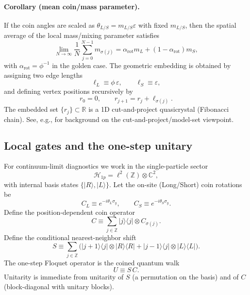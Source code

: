 \paragraph{Corollary (mean coin/mass parameter).}
If the coin angles are scaled as $\theta_{L/S}=m_{L/S}\varepsilon$ with fixed $m_{L/S}$, then the spatial average of the local mass/mixing parameter satisfies
\begin{equation}
    \lim_{N\to\infty}\frac{1}{N}\sum_{j=0}^{N-1} m_{\sigma(j)} = \alpha_{\mathrm{rot}}m_L+(1-\alpha_{\mathrm{rot}})m_S,
\end{equation}
with $\alpha_{\mathrm{rot}}=\phi^{-1}$ in the golden case.
The geometric embedding is obtained by assigning two edge lengths
\begin{equation}
    \ell_L\equiv \phi\,\varepsilon,\qquad \ell_S\equiv \varepsilon,
\end{equation}
and defining vertex positions recursively by
\begin{equation}
    r_0=0,\qquad r_{j+1}=r_j+\ell_{\sigma(j)}.
\end{equation}
The embedded set $\{r_j\}\subset\mathbb{R}$ is a 1D cut-and-project quasicrystal (Fibonacci chain).
See, e.g., \cite{Senechal1995,BaakeGrimm2013AperiodicOrder} for background on the cut-and-project/model-set viewpoint.

\subsection{Local gates and the one-step unitary}
For continuum-limit diagnostics we work in the single-particle sector
\begin{equation}
    \mathcal{H}_{1p}=\ell^2(\mathbb{Z})\otimes\mathbb{C}^2,
\end{equation}
with internal basis states $\{|R\rangle,|L\rangle\}$.
Let the on-site (Long/Short) coin rotations be
\begin{equation}
    C_L\equiv e^{-i\theta_L\sigma_y},\qquad C_S\equiv e^{-i\theta_S\sigma_y}.
\end{equation}
Define the position-dependent coin operator
\begin{equation}
    C\equiv \sum_{j\in\mathbb{Z}} |j\rangle\langle j|\otimes C_{\sigma(j)}.
\end{equation}
Define the conditional nearest-neighbor shift
\begin{equation}
    S\equiv \sum_{j\in\mathbb{Z}}\Big(|j+1\rangle\langle j|\otimes|R\rangle\langle R| + |j-1\rangle\langle j|\otimes|L\rangle\langle L|\Big).
\end{equation}
The one-step Floquet operator is the coined quantum walk
\begin{equation}
    U \equiv S\,C.
\end{equation}
Unitarity is immediate from unitarity of $S$ (a permutation on the basis) and of $C$ (block-diagonal with unitary blocks).

